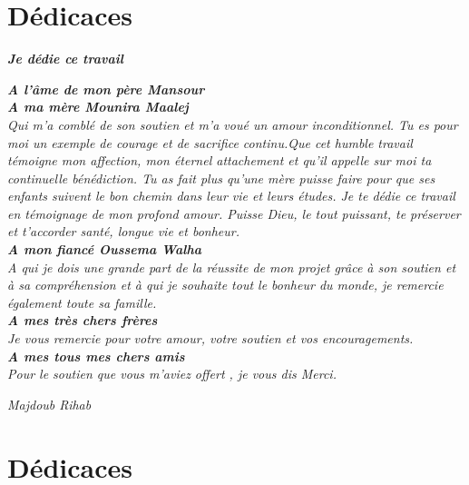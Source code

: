 \section*{Dédicaces}
\vspace{1.0in}

\begin{center}
\textit{\textsl{ \textbf{Je dédie ce travail} } }
\end{center}
\begin{center}
\textsl{
 \textbf{A l'âme de mon père Mansour}
 \\[0.2in]
 \textbf{A ma mère Mounira Maalej}\\ 
 Qui m'a comblé de son soutien et m'a 
voué un amour inconditionnel. Tu es pour moi un exemple de
courage et de sacrifice continu.Que cet humble travail témoigne
mon affection, mon éternel attachement et qu'il appelle sur moi
ta continuelle bénédiction. Tu as fait plus qu’une mère puisse faire pour que ses 
enfants suivent le bon chemin dans leur vie et leurs études. 
Je te dédie ce travail en témoignage de mon profond 
amour. Puisse Dieu, le tout puissant, te préserver et 
t’accorder santé, longue vie et bonheur.
\\[0.2in]
\textbf{A mon fiancé Oussema Walha}\\
A qui je dois une grande part de la réussite de mon projet grâce à
son soutien et à sa compréhension et à qui je souhaite tout le bonheur du monde,
je remercie également toute sa famille.
\\[0.2in]
\textbf{A mes très chers frères}\\
Je vous remercie pour votre amour, 
votre soutien et vos encouragements. 
\\[0.2in]
\textbf{A mes tous mes chers amis}\\
Pour le soutien que vous m'aviez
offert , je vous dis Merci.}

\begin{flushright}
 \textit{\emph {Majdoub Rihab}}
\end{flushright}
\end{center}

\clearpage

\section*{Dédicaces}
\vspace{1.0in}

